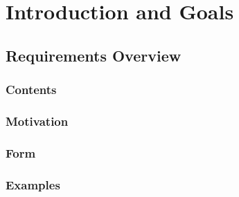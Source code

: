 
\chapter{Introduction and Goals}
\label{chap:Introduction and Goals}


\section{Requirements Overview}
\label{sec:Requirements Overview}


\subsection{Contents}


\subsection{Motivation}


\subsection{Form}


\subsection{Examples}
